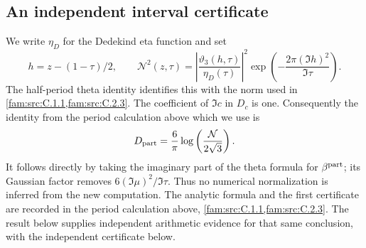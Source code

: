 \subsection{An independent interval certificate}\label{push:section:E.4}
\label{sec:e4}

We write $\eta_D$ for the Dedekind eta function and set
\[
 h=z-(1-\tau)/2,\qquad
 \mathcal N^2(z,\tau)=
 \left|\frac{\vartheta_3(h,\tau)}{\eta_D(\tau)}\right|^2
 \exp\left(-\frac{2\pi(\Im h)^2}{\Im\tau}\right).
\]
The half-period theta identity identifies this with the norm used in
\cref{fam:src:C.1.1,fam:src:C.2.3}. The coefficient of $\Im c$ in $D_c$ is one. Consequently the
identity from the period calculation above which we use is
\[
 D_{\rm part}=\frac6\pi
 \log\left(\frac{\mathcal N}{2\sqrt3}\right).
\]
It follows directly by taking the imaginary part of the theta formula
for $\beta^{\rm part}$; its Gaussian factor removes
$6(\Im\mu)^2/\Im\tau$. Thus no numerical normalization is inferred
from the new computation. The analytic formula and the first
certificate are recorded in the period calculation above, \cref{fam:src:C.1.1,fam:src:C.2.3}. The result below supplies independent
arithmetic evidence for that same conclusion, with the independent certificate below.

